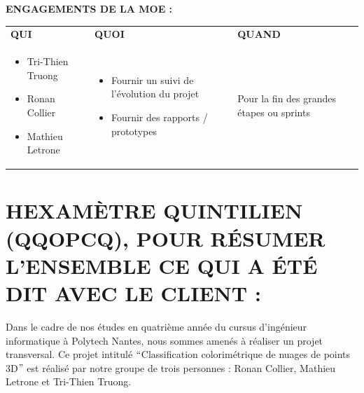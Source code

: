 \documentclass[12pt,titlepage]{report}
\begin{document}
\vspace{\baselineskip}
\vspace{\baselineskip}
\vspace{\baselineskip}
\begin{justify}
\textbf{ENGAGEMENTS DE LA MOE :}
\end{justify}\par


\vspace{\baselineskip}


\begin{table}[H]
 			\centering
\begin{tabular}{p{2in}p{2.79in}p{1.5in}}
\multicolumn{1}{p{1in}}{\textbf{QUI }} & 
\multicolumn{1}{p{1in}}{\textbf{QUOI}} & 
\multicolumn{1}{p{1in}}{\textbf{QUAND }} \\

\multicolumn{1}{p{2in}}{\begin{itemize}
	\item Tri-Thien Truong
	\item Ronan Collier
	\item Mathieu Letrone
\end{itemize}} & 
\multicolumn{1}{p{3in}}{\begin{itemize}
	\item Fournir un suivi de l’évolution du projet	\item Fournir des rapports / prototypes
\end{itemize}} & 
\multicolumn{1}{p{1.5in}}{\vspace{\baselineskip}Pour la fin des grandes étapes ou sprints} \\

\end{tabular}
 \end{table}


\section{HEXAMÈTRE QUINTILIEN (QQOPCQ), POUR RÉSUMER L’ENSEMBLE CE QUI A ÉTÉ DIT AVEC LE CLIENT :}

\vspace{\baselineskip}
\begin{justify}
\tab Dans le cadre de nos études en quatrième année du cursus d’ingénieur informatique à Polytech Nantes, nous sommes amenés à réaliser un projet transversal. Ce projet intitulé $``$Classification colorimétrique de nuages de points 3D$"$  est réalisé par notre groupe de trois personnes : Ronan Collier, Mathieu Letrone et Tri-Thien Truong. 
\end{justify}\par
\end{document}
